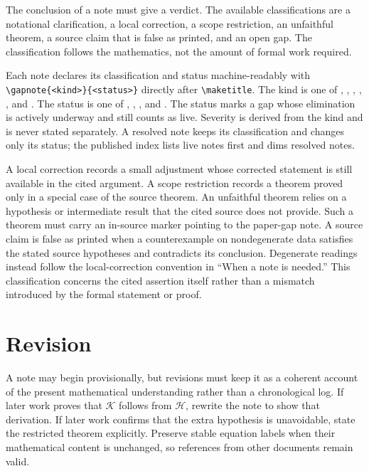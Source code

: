 \documentclass{article}
\providecommand{\gapnote}[2]{%
    \par\noindent\textbf{Verdict:} #1 (#2).\par}
\begin{document}
The conclusion of a note must give a verdict. The available classifications
are a notational clarification, a local correction, a scope restriction, an
unfaithful theorem, a source claim that is false as printed, and an open gap.
The classification follows the mathematics, not the amount of formal work
required.

Each note declares its classification and status machine-readably with
\verb|\gapnote{<kind>}{<status>}| directly after \verb|\maketitle|. The kind
is one of , ,
, , , and
. The status is one of , ,
, and . The status  marks a gap whose
elimination is actively underway and still counts as live. Severity is derived
from the kind and is never stated separately. A resolved note keeps its
classification and changes only its status; the published index lists live
notes first and dims resolved notes.

A local correction records a small adjustment whose corrected statement is
still available in the cited argument. A scope restriction records a theorem
proved only in a special case of the source theorem. An unfaithful theorem
relies on a hypothesis or intermediate result that the cited source does not
provide. Such a theorem must carry an in-source marker pointing to the
paper-gap note. A source claim is false as printed when a counterexample on
nondegenerate data satisfies the stated source hypotheses and contradicts its
conclusion. Degenerate readings instead follow the local-correction convention
in ``When a note is needed.'' This classification concerns the cited assertion
itself rather than a mismatch introduced by the formal statement or proof.

\section{Revision}

A note may begin provisionally, but revisions must keep it as a coherent account
of the present mathematical understanding rather than a chronological log. If
later work proves that $\mathcal K$ follows from $\mathcal H$, rewrite the note
to show that derivation. If later work confirms that the extra hypothesis is
unavoidable, state the restricted theorem explicitly. Preserve stable equation
labels when their mathematical content is unchanged, so references from other
documents remain valid.



\end{document}
